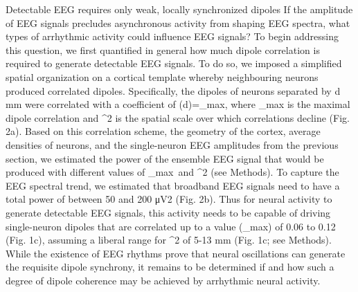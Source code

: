Detectable EEG requires only weak, locally synchronized dipoles
If the amplitude of EEG signals precludes asynchronous activity from shaping EEG spectra, what types of arrhythmic activity could influence EEG signals? To begin addressing this question, we first quantified in general how much dipole correlation is required to generate detectable EEG signals. To do so, we imposed a simplified spatial organization on a cortical template whereby neighbouring neurons produced correlated dipoles. Specifically, the dipoles of neurons separated by d mm were correlated with a coefficient of \rho\left(d\right)=\rho_{max}, where \rho_{max} is the maximal dipole correlation and \sigma^2 is the spatial scale over which correlations decline (Fig. 2a). Based on this correlation scheme, the geometry of the cortex, average densities of neurons, and the single-neuron EEG amplitudes from the previous section, we estimated the power of the ensemble EEG signal that would be produced with different values of \rho_{max}\ and \sigma^2 (see Methods). To capture the EEG spectral trend, we estimated that broadband EEG signals need to have a total power of between 50 and 200 μV2 (Fig. 2b). Thus for neural activity to generate detectable EEG signals, this activity needs to be capable of driving single-neuron dipoles that are correlated up to a value (\rho_{max}) of 0.06 to 0.12 (Fig. 1c), assuming a liberal range for \sigma^2 of 5-13 mm (Fig. 1c; see Methods). While the existence of EEG rhythms prove that neural oscillations can generate the requisite dipole synchrony, it remains to be determined if and how such a degree of dipole coherence may be achieved by arrhythmic neural activity. 

